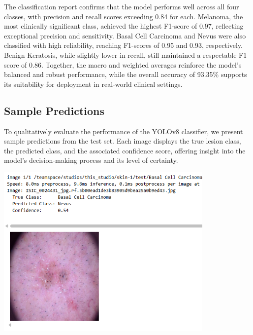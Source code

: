 \documentclass[a4paper,12pt]{report}
\begin{document}
\begin{spacing}{1.5}
    The classification report confirms that the model performs well across all four classes, with precision and recall scores exceeding 0.84 for each. Melanoma, the most clinically significant class, achieved the highest F1-score of 0.97, reflecting exceptional precision and sensitivity. Basal Cell Carcinoma and Nevus were also classified with high reliability, reaching F1-scores of 0.95 and 0.93, respectively. Benign Keratosis, while slightly lower in recall, still maintained a respectable F1-score of 0.86. Together, the macro and weighted averages reinforce the model's balanced and robust performance, while the overall accuracy of 93.35\% supports its suitability for deployment in real-world clinical settings.
    
    \subsection{Sample Predictions}
    
    To qualitatively evaluate the performance of the YOLOv8 classifier, we present sample predictions from the test set. Each image displays the true lesion class, the predicted class, and the associated confidence score, offering insight into the model's decision-making process and its level of certainty.
    
    \begin{center}
        \includegraphics[width=0.8\textwidth]{Pics/pred1.png}
    \end{center}
    

\end{spacing}
\end{document}
